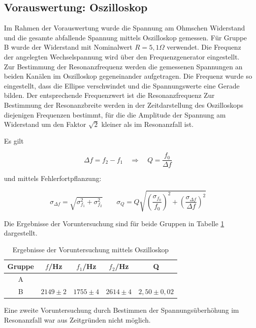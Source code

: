 \documentclass[12pt,a4paper]{article}
\begin{document}
\subsection{Vorauswertung: Oszilloskop}
Im Rahmen der Vorauswertung wurde die Spannung am Ohmschen Widerstand und die gesamte abfallende Spannung mittels Oszilloskop gemessen. Für Gruppe B wurde der Widerstand mit Nominalwert $R = 5,1 \Omega$ verwendet. Die Frequenz der angelegten Wechselspannung wird über den Frequenzgenerator eingestellt.\\

Zur Bestimmung der Resonanzfrequenz werden die gemessenen Spannungen an beiden Kanälen im Oszilloskop gegeneinander aufgetragen. Die Frequenz wurde so eingestellt, dass die Ellipse verschwindet und die Spannungswerte eine Gerade bilden. Der entsprechende Frequenzwert ist die Resonanzfrequenz
Zur Bestimmung der Resonanzbreite werden in der Zeitdarstellung des Oszilloskops diejenigen Frequenzen bestimmt, für die die Amplitude der Spannung am Widerstand um den Faktor $\sqrt{2}$ kleiner als im Resonanzfall ist. 

Es gilt

\begin{equation}
\Delta f = f_2 - f_1 \quad \Rightarrow \quad Q = \frac{f_0}{\Delta f}
\end{equation}

und mittels Fehlerfortpflanzung:

\begin{equation}
\sigma_{\Delta f} = \sqrt{\sigma_{f_1}^2+\sigma_{f_2}^2} \qquad \sigma_Q = Q \sqrt{(\frac{\sigma_{f_0}}{f_0})^2 + (\frac{\sigma_{\Delta f}}{\Delta f})^2}
\end{equation}

Die Ergebnisse der Voruntersuchung sind für beide Gruppen in Tabelle \ref{tab:Voruntersuchung} dargestellt.

\begin{table}
\centering
\begin{tabular}{|c|c|c|c|c|}
\hline
Gruppe & $f$/Hz & $f_1$/Hz & $f_2$/Hz & Q\\
\hline
A & & & &\\
\hline
B & $2149 \pm 2$ & $1755 \pm 4$ & $2614 \pm 4$ & $2,50 \pm 0,02$\\
\hline
\end{tabular}
\caption{Ergebnisse der Voruntersuchung mittels Oszilloskop}
\label{tab:Voruntersuchung}
\end{table}


Eine zweite Voruntersuchung durch Bestimmen der Spannungsüberhöhung im Resonanzfall war aus Zeitgründen nicht möglich.
\end{document}
